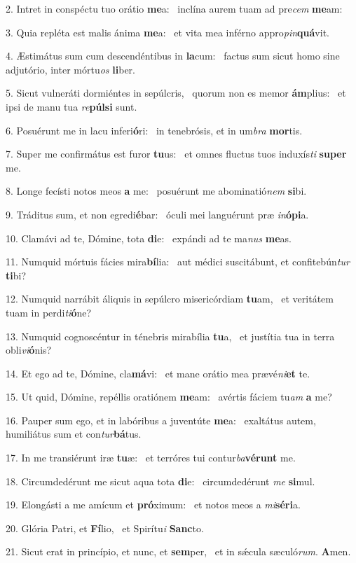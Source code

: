 2. Intret in conspéctu tuo orátio \textbf{me}a: \ast\  inclína aurem tuam ad pre\textit{cem} \textbf{me}am:\

3. Quia repléta est malis ánima \textbf{me}a: \ast\  et vita mea inférno appro\textit{pin}\textbf{quá}vit.\

4. Æstimátus sum cum descendéntibus in \textbf{la}cum: \ast\  factus sum sicut homo sine adjutório, inter mórtu\textit{os} \textbf{li}ber.\

5. Sicut vulneráti dormiéntes in sepúlcris, \dag\  quorum non es memor \textbf{ám}plius: \ast\  et ipsi de manu tua \textit{re}\textbf{púl}\textbf{si} sunt.\

6. Posuérunt me in lacu inferi\textbf{ó}ri: \ast\  in tenebrósis, et in um\textit{bra} \textbf{mor}tis.\

7. Super me confirmátus est furor \textbf{tu}us: \ast\  et omnes fluctus tuos induxís\textit{ti} \textbf{su}\textbf{per} me.\

8. Longe fecísti notos meos \textbf{a} me: \ast\  posuérunt me abominatió\textit{nem} \textbf{si}bi.\

9. Tráditus sum, et non egredi\textbf{é}bar: \ast\  óculi mei languérunt præ \textit{in}\textbf{ó}\textbf{pi}a.\

10. Clamávi ad te, Dómine, tota \textbf{di}e: \ast\  expándi ad te ma\textit{nus} \textbf{me}as.\

11. Numquid mórtuis fácies mira\textbf{bí}lia: \ast\  aut médici suscitábunt, et confitebún\textit{tur} \textbf{ti}bi?\

12. Numquid narrábit áliquis in sepúlcro misericórdiam \textbf{tu}am, \ast\  et veritátem tuam in perdi\textit{ti}\textbf{ó}ne?\

13. Numquid cognoscéntur in ténebris mirabília \textbf{tu}a, \ast\  et justítia tua in terra obli\textit{vi}\textbf{ó}nis?\

14. Et ego ad te, Dómine, cla\textbf{má}vi: \ast\  et mane orátio mea prævé\textit{ni}\textbf{et} te.\

15. Ut quid, Dómine, repéllis oratiónem \textbf{me}am: \ast\  avértis fáciem tu\textit{am} \textbf{a} me?\

16. Pauper sum ego, et in labóribus a juventúte \textbf{me}a: \ast\  exaltátus autem, humiliátus sum et con\textit{tur}\textbf{bá}tus.\

17. In me transiérunt iræ \textbf{tu}æ: \ast\  et terróres tui contur\textit{ba}\textbf{vé}\textbf{runt} me.\

18. Circumdedérunt me sicut aqua tota \textbf{di}e: \ast\  circumdedérunt \textit{me} \textbf{si}mul.\

19. Elongásti a me amícum et \textbf{pró}ximum: \ast\  et notos meos a \textit{mi}\textbf{sé}\textbf{ri}a.\

20. Glória Patri, et \textbf{Fí}lio, \ast\  et Spirítu\textit{i} \textbf{Sanc}to.\

21. Sicut erat in princípio, et nunc, et \textbf{sem}per, \ast\  et in sǽcula sæculó\textit{rum}. \textbf{A}men.\


